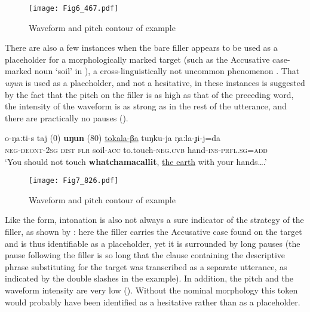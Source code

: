 \documentclass[output=paper]{langscibook}
\begin{document}
 

\begin{figure}
\texttt{[image: Fig6\_467.pdf]}
\caption{Waveform and pitch contour of example }
\label{fig:pakendorf:6}
\end{figure}

There are also a few instances when the bare filler appears to be used as a placeholder for a morphologically marked target (such as the Accusative case-marked noun ‘soil’ in ), a cross-linguistically not uncommon phenomenon \citep[18--19]{Podlesskaya2010}. That \textit{uŋun} is used as a placeholder, and not a hesitative, in these instances is suggested by the fact that the pitch on the filler is as high as that of the preceding word, the intensity of the waveform is as strong as in the rest of the utterance, and there are practically no pauses ().


\ea \label{ex:pakendorf:10}
\gll o-ŋaːti-s
	 taj
	 \textup{(0)}
	 \textbf{uŋun}
	 \textup{(80)}
	 \uline{tokala-βa}
	 tuŋku-ja
	 ŋaːla-ɟi-j=da\\
	\textsc{neg-deont-2sg}
	\textsc{dist}
	{}
	\textsc{flr}
	{}
	soil-\textsc{acc}
	to.touch-\textsc{neg.cvb}
	hand-\textsc{ins}-\textsc{prfl.sg=add}\\
\glt ‘You should not touch \textbf{whatchamacallit}, \uline{the earth} with your hands….’ 
\z
 

\begin{figure}
\texttt{[image: Fig7\_826.pdf]}
\caption{Waveform and pitch contour of example }
\label{fig:pakendorf:7}
\end{figure}

Like the form, intonation is also not always a sure indicator of the strategy of the filler, as shown by : here the filler carries the Accusative case found on the target and is thus identifiable as a placeholder, yet it is surrounded by long pauses (the pause following the filler is so long that the clause containing the descriptive phrase substituting for the target was transcribed as a separate utterance, as indicated by the double slashes in the example). In addition, the pitch and the waveform intensity are very low (). Without the nominal morphology this token would probably have been identified as a hesitative rather than as a placeholder.
\end{document}
